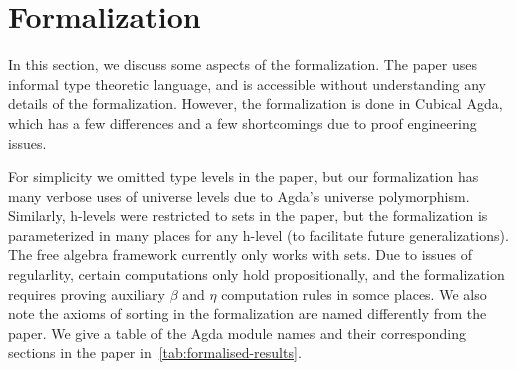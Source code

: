 
\section{Formalization}
\label{sec:formalization}

In this section, we discuss some aspects of the formalization.
The paper uses informal type theoretic language,
and is accessible without understanding any details of the formalization.
However, the formalization is done in Cubical Agda, which has a few differences and a few
shortcomings due to proof engineering issues.

For simplicity we omitted type levels in the paper,
but our formalization has many verbose uses of universe levels due to Agda's universe polymorphism.
Similarly, h-levels were restricted to sets in the paper, but the formalization is parameterized in many places for any
h-level (to facilitate future generalizations).
The free algebra framework currently only works with sets.
Due to issues of regularlity, certain computations only hold propositionally,
and the formalization requires proving auxiliary $\beta$ and $\eta$ computation rules in somce places.
We also note the axioms of sorting in the formalization are named differently from the paper.
We give a table of the Agda module names and their corresponding sections in the paper
in~\cref{tab:formalised-results}.

